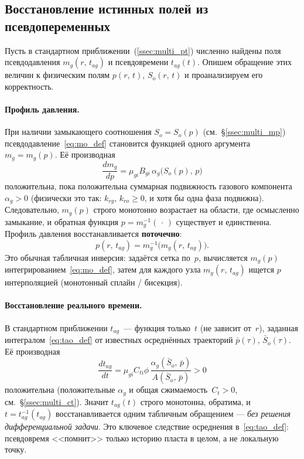 ﻿\documentclass[12pt,a4paper]{article}
\begin{document}
\subsection{Восстановление истинных полей из псевдопеременных}\label{ssec:recover}

Пусть в стандартном приближении~(\ref{ssec:multi_pt})
численно найдены поля псевдодавления $m_g(r,\,t_{ag})$
и псевдовремени $t_{ag}(t)$. Опишем обращение этих величин
к физическим полям $p(r,\,t)$, $S_o(r,\,t)$ и проанализируем
его корректность.

\paragraph{Профиль давления.}
При наличии замыкающего соотношения $S_o = S_o(p)$
(см.~\S\ref{ssec:multi_mp}) псевдодавление~\eqref{eq:mo_def}
становится функцией одного аргумента $m_g = m_g(p)$.
Её производная
\begin{equation}\label{eq:dmdp}
  \frac{dm_g}{dp} = \mu_{gi}B_{gi}\,\alpha_g\bigl(S_o(p),\,p\bigr)
\end{equation}
положительна, пока положительна суммарная подвижность
газового компонента $\alpha_g > 0$ (физически это так:
$k_{rg},\,k_{ro} \ge 0$, и хотя бы одна фаза подвижна).
Следовательно, $m_g(p)$ строго монотонно возрастает
на области, где осмысленно замыкание, и обратная
функция $p = m_g^{-1}(\,\cdot\,)$ существует и единственна.
Профиль давления восстанавливается \textbf{поточечно}:
\begin{equation}\label{eq:recover_p}
  \boxed{\,p(r,\,t_{ag}) = m_g^{-1}\bigl(m_g(r,\,t_{ag})\bigr).\,}
\end{equation}
Это обычная табличная инверсия: задаётся сетка
по~$p$, вычисляется $m_g(p)$ интегрированием~\eqref{eq:mo_def},
затем для каждого узла $m_g(r,\,t_{ag})$ ищется $p$
интерполяцией (монотонный сплайн / бисекция).

\paragraph{Восстановление реального времени.}
В стандартном приближении $t_{ag}$~--- функция
только~$t$ (не зависит от~$r$), заданная
интегралом~\eqref{eq:tao_def} от известных
осреднённых траекторий $\bar p(\tau)$, $\bar S_o(\tau)$.
Её производная
\begin{equation}\label{eq:dtadt}
  \frac{dt_{ag}}{dt} = \mu_{gi}C_{ti}\phi\,
  \frac{\alpha_g(\bar S_o,\,\bar p)}{A(\bar S_o,\,\bar p)} > 0
\end{equation}
положительна (положительные $\alpha_g$ и общая
сжимаемость~$C_t > 0$, см.~\S\ref{ssec:multi_ct}).
Значит $t_{ag}(t)$ строго монотонна, обратима, и
$t = t_{ag}^{-1}(t_{ag})$ восстанавливается одним
табличным обращением --- \emph{без решения
дифференциальной задачи}. Это ключевое следствие
осреднения в~\eqref{eq:tao_def}: псевдовремя
<<помнит>> только историю пласта в целом, а не
локальную точку.
\end{document}
